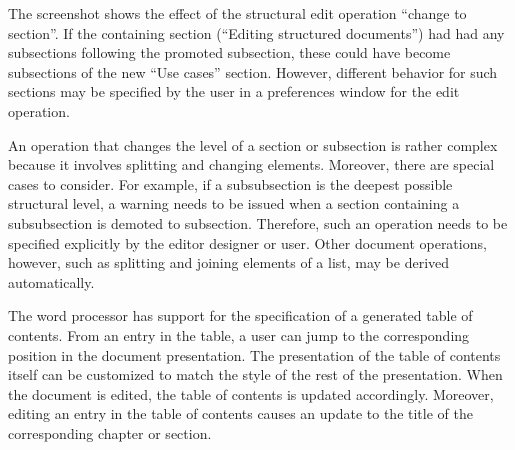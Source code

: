 \documentclass{speauth}
\begin{document}
The screenshot shows the effect of the structural edit operation ``change to section''. If the containing section (``Editing structured documents'') had had any subsections following the promoted subsection, these could have become subsections of the new ``Use cases'' section. However, different behavior for such sections may be specified by the user in a preferences window for the edit operation.

An operation that changes the level of a section or subsection is rather complex because it involves splitting and changing elements. Moreover, there are special cases to consider. For example, if a subsubsection is the deepest possible structural level, a warning needs to be issued when a section containing a subsubsection is demoted to subsection. Therefore, such an operation needs to be specified explicitly by the editor designer or user. Other document operations, however, such as splitting and joining elements of a list, may be derived automatically.



The word processor has support for the specification of a generated table of contents. From an entry in the table, a user can jump to the corresponding position in the document presentation. The presentation of the table of contents itself can be customized to match the style of the rest of the presentation. When the document is edited, the table of contents is updated accordingly. Moreover, editing an entry in the table of contents causes an update to the title of the corresponding chapter or section.

\newcommand{\editScreenshotTrnsFrSmall}[3]{%
%
\noindent
\begin{center}
\begin{picture}(350,110)(0,0)
\begin{scriptsize}
\put(0,30){ \makebox(160,95){#1}}
\put(-14,30){ \epsfig{file=pics/eps/frameSmall.eps, height=80pt} }
\put(180,30){ \makebox(160,95){#2}}
\put(180,30){ \epsfig{file=pics/eps/frameSmall.eps, height=80pt} }
\end{scriptsize}
\put(166,66){ $\Rightarrow$}
\put(96,0) { \makebox(150,30){#3}}
\end{picture}
\end{center}
}
\end{document}
